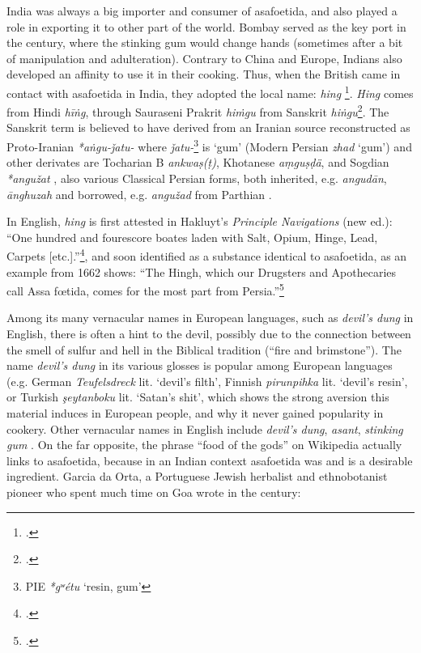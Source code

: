 

India was always a big importer and consumer of asafoetida, and also played a role in exporting it to other part of the world. Bombay served as the key port in the  century, where the stinking gum would change hands (sometimes after a bit of manipulation and adulteration). Contrary to China and Europe, Indians also developed an affinity to use it in their cooking. Thus, when the British came in contact with asafoetida in India, they adopted the local name: \textit{hing} \footcite[see][p. 418, ]{yule_hobson-jobson_1903}. \textit{Hing} comes from Hindi  
\textit{hīṅg}, through Sauraseni Prakrit \textit{hiṁgu} from Sanskrit 
\textit{hiṅgu}\footcite[hing]{ahd}. The Sanskrit term is believed to have derived from an Iranian source reconstructed as Proto-Iranian \textit{*aṅgu-ǰatu-} where \textit{ǰatu-}\footnote{\gls{PIE} \textit{*gʷétu} `resin, gum'} is `gum' (Modern Persian  \textit{zhad} `gum') and other derivates are Tocharian B \textit{ankwaṣ(ṭ)}, Khotanese \textit{a\d{m}gu\d{s}\d{d}ä}, and Sogdian \textit{*angužat} \autocites[7]{adams_dictionary_2013}[87]{gharib_sogdian_1995}[281]{turner_comparative_1962}, also various Classical Persian forms, both inherited, e.g.  \textit{angudān},  \textit{ānghuzah} and borrowed, e.g.  \textit{angužad} from Parthian \autocite[438]{tremblay_irano-tocharica_2005}. 

In English, \textit{hing} is first attested in Hakluyt's \textit{Principle Navigations} (new ed.): ``One hundred and fourescore boates laden with Salt, Opium, Hinge, Lead, Carpets [etc.].''\footcite[\url{http://www.perseus.tufts.edu/hopper/searchresults?target=en&inContent=true&q=hinge&doc=Perseus\%3Atext\%3A1999.03.0070}]{hakluyt_principall_1589}, and soon identified as a substance identical to asafoetida, as an example from 1662 shows: ``The Hingh, which our Drugsters and Apothecaries call Assa fœtida, comes for the most part from Persia.''\footcite[hing, \url{https://www.oed.com/view/Entry/87092}]{oed} 

Among its many vernacular names in European languages, such as \textit{devil's dung} in English, there is often a hint to the devil, possibly due to the connection between the smell of sulfur and hell in the Biblical tradition (``fire and brimstone''). The name \textit{devil's dung} in its various glosses is popular among European languages (e.g. German \textit{Teufelsdreck} lit. `devil's filth', Finnish \textit{pirunpihka} lit. `devil's resin', or Turkish \textit{şeytanboku} lit. `Satan's shit', which shows the strong aversion this material induces in European people, and why it never gained popularity in cookery. Other vernacular names in English include \textit{devil's dung}, \textit{asant}, \textit{stinking gum} \autocite[cf.][]{george_asafoetida_2012}. On the far opposite, the phrase ``food of the gods'' on Wikipedia actually links to asafoetida, because in an Indian context asafoetida was and is a desirable ingredient. Garcia da Orta, a Portuguese Jewish herbalist and ethnobotanist pioneer who spent much time on Goa wrote in the  century:

